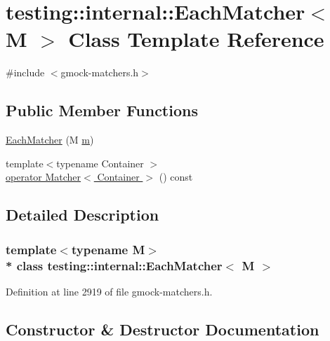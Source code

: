 \hypertarget{classtesting_1_1internal_1_1_each_matcher}{}\section{testing\+:\+:internal\+:\+:Each\+Matcher$<$ M $>$ Class Template Reference}
\label{classtesting_1_1internal_1_1_each_matcher}


{\ttfamily \#include $<$gmock-\/matchers.\+h$>$}

\subsection*{Public Member Functions}
\begin{DoxyCompactItemize}
\item 
\hyperlink{classtesting_1_1internal_1_1_each_matcher_a597f567d454f85733c66f7527f9aadb7}{Each\+Matcher} (M \hyperlink{variables__e_8js_aab4247b6acebcba996939b177f483c14}{m})
\item 
{\footnotesize template$<$typename Container $>$ }\\\hyperlink{classtesting_1_1internal_1_1_each_matcher_ad00ab5ef26ae8c41d7d36a5ef4ed713e}{operator Matcher$<$ Container $>$} () const 
\end{DoxyCompactItemize}


\subsection{Detailed Description}
\subsubsection*{template$<$typename M$>$\\*
class testing\+::internal\+::\+Each\+Matcher$<$ M $>$}



Definition at line 2919 of file gmock-\/matchers.\+h.



\subsection{Constructor \& Destructor Documentation}
